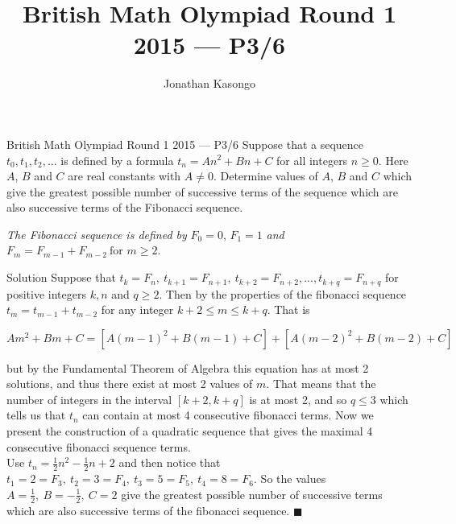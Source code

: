 \documentclass{article}
\author{Jonathan Kasongo}
\title{British Math Olympiad Round 1 2015 --- P3/6}
\begin{document}
\maketitle

\begin{problem}{British Math Olympiad Round 1 2015 --- P3/6}
Suppose that a sequence \( t_0, t_1, t_2, \ldots \) is defined by a formula
\(
t_n = An^2 + Bn + C
\)
for all integers \( n \geq 0 \). Here \( A \), \( B \) and \( C \) are real constants with \( A \neq 0 \). Determine values of \( A \), \( B \) and \( C \) which give the greatest possible number of successive terms of the sequence which are also successive terms of the Fibonacci sequence.

\textit{The Fibonacci sequence is defined by} \( F_0 = 0 \), \( F_1 = 1 \) \textit{and}
\(
F_m = F_{m-1} + F_{m-2} \ \text{for } m \geq 2.
\)
\end{problem}

\begin{solution}{Solution}
Suppose that $t_k = F_n, \ t_{k+1} = F_{n+1}, \ t_{k+2} = F_{n+2}, ...,
t_{k+q} = F_{n+q}$ for positive integers $k, n$ and $q \geq 2$.
Then by the properties of the fibonacci sequence
$t_m = t_{m-1} + t_{m-2}$ for any integer $k+2 \leq m \leq k + q$.
That is

$$
Am^2 + Bm + C = \left[ A(m-1)^2 + B(m-1) + C \right] +
\left[ A(m-2)^2 + B(m-2) + C \right]
$$

but by the Fundamental Theorem of Algebra this equation has at most
2 solutions, and thus there exist at most 2 values of $m$. That means that
the number of integers in the interval $[k+2, k+q]$ is at most 2, and so
$q \leq 3$ which tells us that $t_n$ can contain at most 4 consecutive
fibonacci terms. Now we present the construction of a quadratic sequence
that gives the maximal 4 consecutive fibonacci sequence terms.\\

Use $t_n = \frac{1}{2} n^2 - \frac{1}{2} n + 2$ and then notice that
$t_1 = 2 = F_3, \ t_2 = 3 = F_4, \ t_3 = 5 = F_5, \ t_4 = 8 = F_6$. So
the values $A=\frac{1}{2}, \ B=-\frac{1}{2}, \ C=2$ give the greatest
possible number of successive terms which are also successive terms of the
fibonacci sequence. $\blacksquare$
\end{solution}
\end{document}
